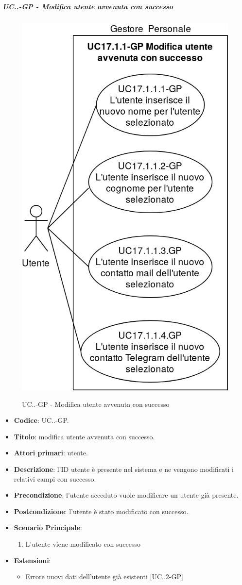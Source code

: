 		\subparagraph{UC\theuccount.\thesubuccount.\thesubsubuccount-GP - Modifica utente avvenuta con successo}
			\begin{figure}[H]
				\centering
				\includegraphics[width=0.5\columnwidth]{img/casi_d'uso/UC17_1_1.png}\\
				\caption{UC\theuccount.\thesubuccount.\thesubsubuccount-GP - Modifica utente avvenuta con successo}
			\end{figure}
			\begin{itemize}
				\item \textbf{Codice}: UC\theuccount.\thesubuccount.\thesubsubuccount-GP.
				\item \textbf{Titolo}: modifica utente avvenuta con successo.
				\item \textbf{Attori primari}: utente.
				\item \textbf{Descrizione}: l'ID utente è presente nel sistema e ne vengono modificati i relativi campi con successo.
				\item \textbf{Precondizione}: l'utente acceduto vuole modificare un utente già presente.
				\item \textbf{Postcondizione}: l'utente è stato modificato con successo.
				\item \textbf{Scenario Principale}:
				\begin{enumerate}
					\item L'utente viene modificato con successo
				\end{enumerate}
				\item \textbf{Estensioni}:
				\begin{itemize}
					\item Errore nuovi dati dell'utente già esistenti [UC\theuccount.\thesubuccount.2-GP]
				\end{itemize}
			\end{itemize}
			
